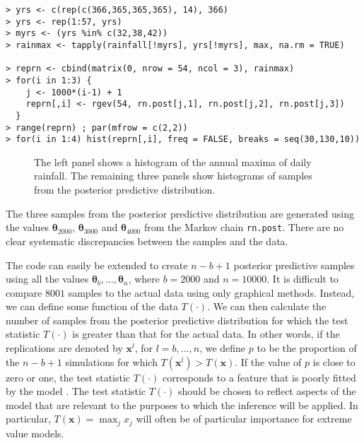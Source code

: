 \documentclass[11pt,a4paper]{article}
\newcommand{\bs}{\boldsymbol}
\begin{document}
\begin{verbatim}
> yrs <- c(rep(c(366,365,365,365), 14), 366) 
> yrs <- rep(1:57, yrs) 
> myrs <- (yrs %in% c(32,38,42))
> rainmax <- tapply(rainfall[!myrs], yrs[!myrs], max, na.rm = TRUE)
 
> reprn <- cbind(matrix(0, nrow = 54, ncol = 3), rainmax)
> for(i in 1:3) {
    j <- 1000*(i-1) + 1 
    reprn[,i] <- rgev(54, rn.post[j,1], rn.post[j,2], rn.post[j,3])
  }
> range(reprn) ; par(mfrow = c(2,2))
> for(i in 1:4) hist(reprn[,i], freq = FALSE, breaks = seq(30,130,10))
\end{verbatim}

\begin{figure}
\begin{center}
   \vspace{-1.5cm}
  \hspace{-0.5cm} 
  \hspace{-0.5cm} 
  \hspace{-0.5cm} 
\end{center}
\caption{The left panel shows a histogram of the annual maxima of
  daily rainfall. The remaining three panels show histograms of
  samples from the posterior predictive distribution.}
\label{diagrain}
\end{figure}

The three samples from the posterior predictive distribution are
generated using the values $\bs{\theta}_{2000}$, $\bs{\theta}_{3000}$
and $\bs{\theta}_{4000}$ from the Markov chain \verb+rn.post+.  There
are no clear systematic discrepancies between the samples and the
data.

The code can easily be extended to create $n-b+1$ posterior predictive
samples using all the values $\bs{\theta}_b, \dots, \bs{\theta}_n$,
where $b=2000$ and $n=10000$.  It is difficult to compare $8001$
samples to the actual data using only graphical methods.  Instead, we
can define some function of the data $T(\cdot)$.  We can then
calculate the number of samples from the posterior predictive
distribution for which the test statistic $T(\cdot)$ is greater than
that for the actual data.  In other words, if the replications are
denoted by $\bs{x}^l$, for $l=b,\dots,n$, we define $p$ to be the
proportion of the $n-b+1$ simulations for which $T(\bs{x}^l) >
T(\bs{x})$.  If the value of $p$ is close to zero or one, the test
statistic $T(\cdot)$ corresponds to a feature that is poorly fitted by
the model \citep{gelmcarl95}.  The test statistic $T(\cdot)$ should be
chosen to reflect aspects of the model that are relevant to the
purposes to which the inference will be applied.  In particular,
$T(\bs{x}) = \max_j x_j$ will often be of particular importance for
extreme value models.
\end{document}
